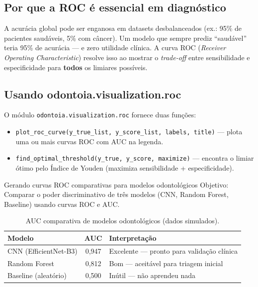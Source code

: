 \subsection{Por que a ROC é essencial em diagnóstico}

A acurácia global pode ser enganosa em datasets desbalanceados (ex.: 95\%
de pacientes saudáveis, 5\% com câncer). Um modelo que sempre prediz
``saudável'' teria 95\% de acurácia — e zero utilidade clínica. A curva
ROC (\textit{Receiver Operating Characteristic}) resolve isso ao mostrar
o \textit{trade-off} entre sensibilidade e especificidade para \textbf{todos}
os limiares possíveis.

 

\subsection{Usando odontoia.visualization.roc}

O módulo \texttt{odontoia.visualization.roc} fornece duas funções:

\begin{itemize}
  \item \texttt{plot\_roc\_curve(y\_true\_list, y\_score\_list, labels,
    title)} — plota uma ou mais curvas ROC com AUC na legenda.
  \item \texttt{find\_optimal\_threshold(y\_true, y\_score, maximize)} —
    encontra o limiar ótimo pelo Índice de Youden (maximiza sensibilidade
    + especificidade).
\end{itemize}

\begin{pratica}{Gerando curvas ROC comparativas para modelos odontológicos}
  Objetivo: Comparar o poder discriminativo de três modelos (CNN, Random
  Forest, Baseline) usando curvas ROC e AUC.
\end{pratica}

\begin{table}[H]
  \centering
  \caption{AUC comparativa de modelos odontológicos (dados simulados).}
  \label{tab:roc-comparison}
  \begin{tabularx}{\textwidth}{lcX}
    \toprule
    \textbf{Modelo} & \textbf{AUC} & \textbf{Interpretação} \\
    \midrule
    CNN (EfficientNet-B3) & 0,947 & Excelente — pronto para validação clínica \\
    Random Forest & 0,812 & Bom — aceitável para triagem inicial \\
    Baseline (aleatório) & 0,500 & Inútil — não aprendeu nada \\
    \bottomrule
  \end{tabularx}
\end{table}

